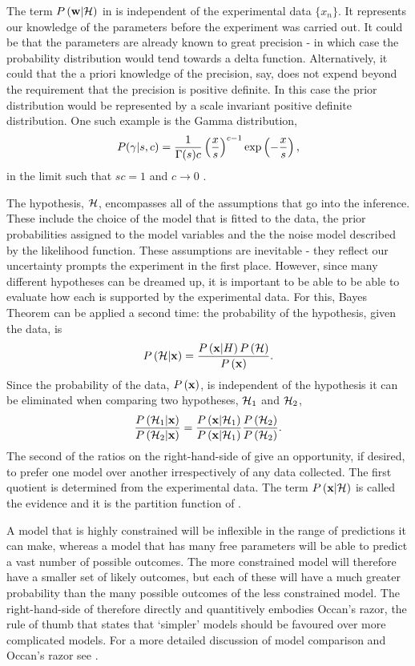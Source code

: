 {The term $P\left( \mathbf{w}|{\cal H} \right)$ in  is independent of the experimental data $\{x_n\}$.  
It  represents our knowledge of the parameters before the experiment was carried out.
It could be that the parameters are already known to great precision - 
in which case the probability distribution would tend towards a delta function.
Alternatively, it could that the a priori knowledge of the precision, say, 
does not expend beyond the requirement that the precision is positive definite.
In this case the prior distribution would be represented by a scale invariant positive definite distribution.
One such example is the Gamma distribution,
\begin{align}
  P(\gamma|s,c) = \frac{1}{\Gamma(s)c}\left( \frac{x}{s} \right)^{c-1}\exp\left( -\frac{x}{s} \right),
\label{eqn:Gamma}
\end{align}
in the limit such that $sc = 1$ and $c\rightarrow 0$ \cite{MacKay2003}.

The hypothesis, ${\cal H}$,  encompasses all of the assumptions that go into the inference.
These include the choice of the model that is fitted to the data, 
the prior probabilities assigned to the model variables and the 
the noise model described by the likelihood function.
These assumptions are inevitable - they reflect our uncertainty 
 prompts the experiment in the first place.
However, 
since many different hypotheses can be dreamed up,
it is important to be able to be able to evaluate how each is supported by the experimental data.
For this, Bayes Theorem can be applied a second time:
the probability of the hypothesis, given the data, is
\begin{align}
P\left( {\cal H} | \mathbf{x}  \right) = \frac{P\left( \mathbf{x}|H \right)P\left( {\cal H} \right)}{P\left( \mathbf{x} \right)}.
\label{eqn:BayesHyp}
\end{align}
Since the probability of the data, $P\left( \mathbf{x} \right)$, 
is independent of the hypothesis
it can be eliminated when comparing two hypotheses, ${\cal H}_1$ and ${\cal H}_2$,
\begin{align}
\frac{P\left( {\cal H}_1 | \mathbf{x}  \right)}{P\left( {\cal H}_2 | \mathbf{x}  \right)} = \frac{P\left( \mathbf{x}|{\cal H}_1 \right)}{P\left( \mathbf{x}|{\cal H}_1 \right)}\frac{P\left( {\cal H}_2 \right)}{P\left( {\cal H}_2 \right)}.
\label{eqn:ModelCmp}
\end{align}
The second of the ratios on the right-hand-side of 
give an opportunity, if desired, to prefer one model over another irrespectively of any data collected.
The first quotient is determined from the experimental data.
The term $P\left( \mathbf{x}|{\cal H} \right)$ is called the evidence and it is the partition function of  .

A model that is highly constrained will be inflexible in the range of predictions it can make,
whereas a model that has many free parameters will be able to predict a vast number of possible outcomes.
The more constrained model will therefore have a smaller set of likely outcomes,
but each of these will have a much greater probability than the many possible outcomes of the less constrained model.
The right-hand-side of  therefore directly and quantitively embodies Occan's razor,
the rule of thumb that states that `simpler' models should be favoured over more complicated models.
For a more detailed discussion of model comparison and Occan's razor see \cite[Chapter 28]{Mackay2003}.

}

